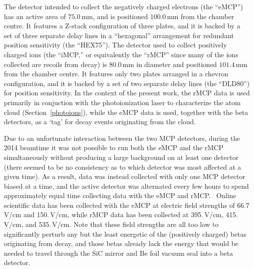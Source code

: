 The detector intended to collect the negatively charged electrons (the ``eMCP'') has an active area of $75.0\,$mm, and is positioned 
$100.0\,$mm from the chamber centre.  It features a Z-stack configuration of three plates, and it is backed by a set of three separate delay lines in a ``hexagonal'' arrangement for redundant position sensitivity (the ``HEX75'').  The detector used to collect positively charged ions (the ``iMCP,'' or equivalently the ``rMCP'' since many of the ions collected are recoils from decay) is $80.0\,$mm in diameter and positioned $101.4\,$mm from the chamber centre.  It features only two plates arranged in a chevron configuration, and it is backed by a set of two separate delay lines (the ``DLD80'') for position sensitivity.  In the context of the present work, the rMCP data is used primarily in conjuction with the photoionization laser to characterize the atom cloud (Section~\ref{photoions}), while the eMCP data is used, together with the beta detectors, as a `tag' for decay events originating from the cloud. 

Due to an unfortunate interaction between the two MCP detectors, during the 2014 beamtime it was not possible to run both the eMCP and the rMCP simultaneously without producing a large background on at least one detector (there seemed to be no consistency as to which detector was most affected at a given time).  As a result, data was instead collected with only one MCP detector biased at a time, and the active detector was alternated every few hours to spend approximately equal time collecting data with the eMCP and rMCP.~  Online scientific data has been collected with the eMCP at electric field strengths of 66.7\,V/cm and 150.\,V/cm, while rMCP data has been collected at 395.\,V/cm, 415.\,V/cm, and 535.\,V/cm.  Note that these field strengths are all too low to significantly perturb any but the least energetic of the (positively charged) betas originating from decay, and those betas already lack the energy that would be needed to travel through the SiC mirror and Be foil vacuum seal into a beta detector. 

